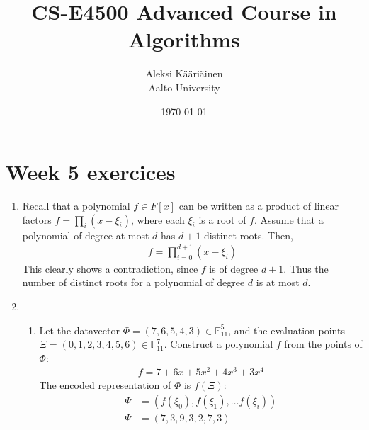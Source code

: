 \documentclass[11pt,a4paper]{article}
\title{CS-E4500 Advanced Course in Algorithms}
\author{Aleksi Kääriäinen  \\
	Aalto University  \\
	}
\begin{document}
\date{\today}

\maketitle

\newpage

\section*{Week 5 exercices}

\begin{enumerate}
    \item Recall that a polynomial $f \in F[x]$ can be written as a product of linear factors $f = \prod_{i}(x - \xi_i)$,
          where each $\xi_i$ is a root of $f$. Assume that a polynomial of degree at most $d$ has $d + 1$ distinct roots. Then,
          \begin{align*}
              f = \prod_{i = 0}^{d + 1}(x - \xi_i)
          \end{align*}
          This clearly shows a contradiction, since $f$ is of degree $d + 1$. Thus the number of distinct roots for a polynomial
          of degree $d$ is at most $d$.
          \newpage

    \item \begin{enumerate}
              \item Let the datavector $\Phi = (7, 6, 5, 4, 3) \in \mathbb{F}^5_{11}$, and the evaluation points
                    $\Xi = (0, 1, 2, 3, 4, 5, 6) \in \mathbb{F}_{11}^7$. Construct a polynomial $f$ from the points of $\Phi$:
                    \begin{align*}
                        f = 7 + 6x + 5x^2 + 4x^3 + 3x^4
                    \end{align*}
                    The encoded representation of $\Phi$ is $f(\Xi)$:
                    \begin{align*}
                        \Psi & = (f(\xi_0), f(\xi_1), \dots f(\xi_i)) \\
                        \Psi & = (7, 3, 9, 3, 2, 7, 3)
                    \end{align*}


\end{enumerate}
\end{enumerate}
\end{document}
